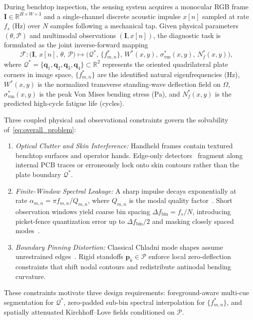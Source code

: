 \documentclass[journal]{IEEEtran}
\begin{document}
During benchtop inspection, the sensing system acquires a monocular RGB frame $\mathbf{I} \in \mathbb{R}^{H \times W \times 3}$ and a single-channel discrete acoustic impulse $x[n]$ sampled at rate $f_s$ (Hz) over $N$ samples following a mechanical tap. Given physical parameters $(\theta, \mathcal{P})$ and multimodal observations $(\mathbf{I}, x[n])$, the diagnostic task is formulated as the joint inverse-forward mapping
\begin{equation}
\mathcal{F} : \bigl(\mathbf{I},\, x[n],\, \theta,\, \mathcal{P}\bigr) \mapsto \bigl(\mathcal{Q}^*,\, \{f^*_{m,n}\},\, W^*(x,y),\, \sigma^*_{\mathrm{vm}}(x,y),\, N^*_f(x,y)\bigr),
\label{eq:overall_problem}
\end{equation}
where $\mathcal{Q}^* = \{\mathbf{q}_1, \mathbf{q}_2, \mathbf{q}_3, \mathbf{q}_4\} \subset \mathbb{R}^2$ represents the oriented quadrilateral plate corners in image space, $\{f^*_{m,n}\}$ are the identified natural eigenfrequencies (Hz), $W^*(x,y)$ is the normalized transverse standing-wave deflection field on $\Omega$, $\sigma^*_{\mathrm{vm}}(x,y)$ is the peak Von Mises bending stress (Pa), and $N^*_f(x,y)$ is the predicted high-cycle fatigue life (cycles).

Three coupled physical and observational constraints govern the solvability of~\eqref{eq:overall_problem}:
\begin{enumerate}
\item \textit{Optical Clutter and Skin Interference:} Handheld frames contain textured benchtop surfaces and operator hands. Edge-only detectors~\cite{canny1986computational} fragment along internal PCB traces or erroneously lock onto skin contours rather than the plate boundary $\mathcal{Q}^*$.
\item \textit{Finite-Window Spectral Leakage:} A sharp impulse decays exponentially at rate $\alpha_{m,n} = \pi f_{m,n} / Q_{m,n}$, where $Q_{m,n}$ is the modal quality factor~\cite{beards1996structural}. Short observation windows yield coarse bin spacing $\Delta f_{\mathrm{bin}} = f_s / N$, introducing picket-fence quantization error up to $\Delta f_{\mathrm{bin}}/2$ and masking closely spaced modes~\cite{offelli1990interpolation,schoukens1992interpolated}.
\item \textit{Boundary Pinning Distortion:} Classical Chladni mode shapes assume unrestrained edges~\cite{leissa1969vibration}. Rigid standoffs $\mathbf{p}_k \in \mathcal{P}$ enforce local zero-deflection constraints that shift nodal contours and redistribute antinodal bending curvature.
\end{enumerate}
These constraints motivate three design requirements: foreground-aware multi-cue segmentation for $\mathcal{Q}^*$, zero-padded sub-bin spectral interpolation for $\{f^*_{m,n}\}$, and spatially attenuated Kirchhoff--Love fields conditioned on $\mathcal{P}$.
\end{document}
